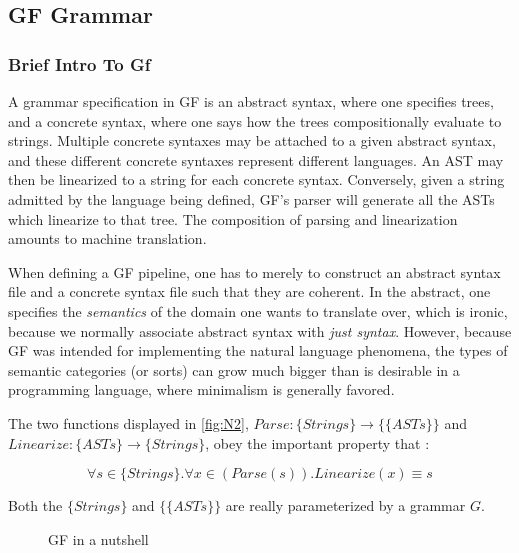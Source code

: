 \documentclass[a4paper, 11pt]{article}
\begin{document}
\subsection{GF Grammar}

\subsubsection{Brief Intro To Gf}

A grammar specification in GF is an abstract syntax, where one specifies trees,
and a concrete syntax, where one says how the trees compositionally evaluate to
strings. Multiple concrete syntaxes may be attached to a given abstract syntax,
and these different concrete syntaxes represent different languages. An AST may
then be linearized to a string for each concrete syntax. Conversely, given a
string admitted by the language being defined, GF's parser will generate all the
ASTs which linearize to that tree. The composition of parsing and linearization
amounts to machine translation.

When defining a GF pipeline, one has to merely to construct an abstract syntax
file and a concrete syntax file such that they are coherent. In the abstract,
one specifies the \emph{semantics} of the domain one wants to translate over,
which is ironic, because we normally associate abstract syntax with \emph{just
syntax}. However, because GF was intended for implementing the natural language
phenomena, the types of semantic categories (or sorts) can grow much bigger than
is desirable in a programming language, where minimalism is generally favored.

The two functions displayed in \autoref{fig:N2}, $Parse : \{Strings\}
\rightarrow \{\{ASTs\}\}$ and $Linearize : \{ASTs\} \rightarrow \{Strings\}$, obey
the important property that :

 $$\forall s \in \{Strings\}. \forall x \in (Parse(s)). Linearize(x) \equiv s$$

Both the $\{Strings\}$ and $\{\{ASTs\}\}$ are really parameterized by a grammar
$G$.

\begin{figure}
\centering
{}
\caption{GF in a nutshell} \label{fig:N2}
\end{figure}
\end{document}
